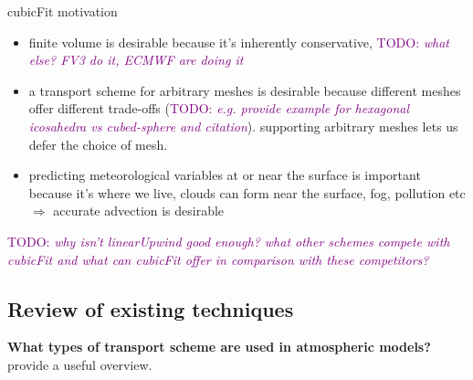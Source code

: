 \documentclass[times]{elsarticle}
\newcommand{\TODO}[1]{\textcolor{purple}{TODO: \emph{#1}}}
\begin{document}
cubicFit motivation
\begin{itemize}
	\item finite volume is desirable because it's inherently conservative, \TODO{what else?  FV3 do it, ECMWF are doing it}
	\item a transport scheme for arbitrary meshes is desirable because different meshes offer different trade-offs (\TODO{e.g. provide example for hexagonal icosahedra vs cubed-sphere and citation}).  supporting arbitrary meshes lets us defer the choice of mesh.
	\item predicting meteorological variables at or near the surface is important because it's where we live, clouds can form near the surface, fog, pollution etc $\Rightarrow$ accurate advection is desirable
\end{itemize}

\TODO{why isn't linearUpwind good enough?  what other schemes compete with cubicFit and what can cubicFit offer in comparison with these competitors?}

\subsection{Review of existing techniques}
\textbf{What types of transport scheme are used in atmospheric models?} \\
\citep{lauritzen2014} provide a useful overview.
\end{document}
